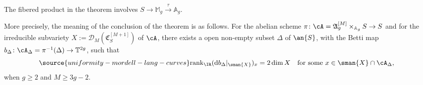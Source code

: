 The fibered product in the theorem involves
$S\rightarrow\mathbb{M}_g\xrightarrow{\tau} \mathbb{A}_g$.

More precisely, the meaning of the conclusion of the theorem is as follows. For the abelian scheme $\pi \colon \cA = \mathfrak{A}_g^{[M]} \times_{\mathbb{A}_g}S \rightarrow S$ and for the irreducible subvariety $X:=\mathscr{D}_M( \mathfrak{C}_S^{[M+1]} )$ of $\cA$, there exists a open non-empty subset $\Delta$ of $\an{S}$, with the Betti map $b_{\Delta} \colon \cA_{\Delta} = \pi^{-1}(\Delta) \rightarrow \mathbb{T}^{2g}$, such that
\begin{equation}\label{EqNonDegXDMC}
\source{uniformity-mordell-lang-curves}
\mathrm{rank}_{\IR} (\mathrm{d}b_{\Delta}|_{\sman{X}})_x = 2\dim X\quad \text{for some }x \in \sman{X} \cap \cA_{\Delta},
\end{equation}
when $g \ge 2$ and $M \ge 3g-2$.


